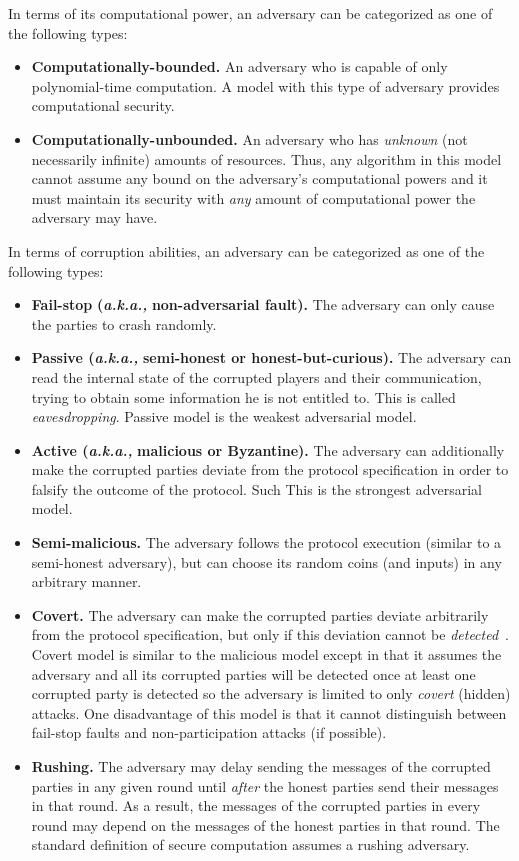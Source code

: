 \documentclass[10pt]{article}
\theoremstyle{plain}
\begin{document}
In terms of its computational power, an adversary can be categorized
as one of the following types:
\begin{itemize}
	\item \textbf{Computationally-bounded.} An adversary who is capable of only
	polynomial-time computation. A model with this type of adversary provides
	computational security.
	\item \textbf{Computationally-unbounded.} An adversary who has \emph{unknown}
	(not necessarily infinite) amounts of resources. Thus, any algorithm
	in this model cannot assume any bound on the adversary's computational
	powers and it must maintain its security with \emph{any} amount of
	computational power the adversary may have. 
\end{itemize}
In terms of corruption abilities, an adversary can be categorized
as one of the following types:
\begin{itemize}
	\item \textbf{Fail-stop} \textbf{(}\textbf{\emph{a.k.a.,}}\textbf{ non-adversarial
		fault). }The adversary can only cause the parties to crash randomly.
	\item \textbf{Passive (}\textbf{\emph{a.k.a.,}}\textbf{ semi-honest or honest-but-curious).}
	The adversary can read the internal state of the corrupted players
	and their communication, trying to obtain some information he is not
	entitled to. This is called \emph{eavesdropping}. Passive model is
	the weakest adversarial model. 
	\item \textbf{Active (}\textbf{\emph{a.k.a.,}}\textbf{ malicious or Byzantine).}
	The adversary can additionally make the corrupted parties deviate
	from the protocol specification in order to falsify the outcome of
	the protocol. Such This is the strongest adversarial model. 
	\item \textbf{Semi-malicious. }The adversary\textbf{ }follows the protocol
	execution (similar to a semi-honest adversary), but can choose its
	random coins (and inputs) in any arbitrary manner.
	\item \textbf{Covert.} The adversary can make the corrupted parties deviate
	arbitrarily from the protocol specification, but only if this deviation
	cannot be \emph{detected}~\cite{Aumann:2010:SAC:1713119.1713121}.
	Covert model is similar to the malicious model except in that it assumes
	the adversary and all its corrupted parties will be detected once
	at least one corrupted party is detected so the adversary is limited
	to only \emph{covert} (hidden) attacks. One disadvantage of this model
	is that it cannot distinguish between fail-stop faults and non-participation
	attacks (if possible).
	\item \textbf{Rushing. }The adversary may delay sending the messages of
	the corrupted parties in any given round until \emph{after} the honest
	parties send their messages in that round. As a result, the messages
	of the corrupted parties in every round may depend on the messages
	of the honest parties in that round. The standard definition of secure
	computation assumes a rushing adversary.
\end{itemize}
\end{document}
